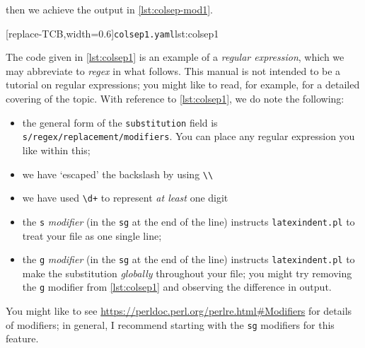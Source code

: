 \begin{example}
 then we achieve the output in \cref{lst:colsep-mod1}.  

 \begin{cmhtcbraster}
  [replace-TCB,width=0.6\textwidth]{\texttt{colsep1.yaml}}{lst:colsep1}
 \end{cmhtcbraster}

 The code given in \cref{lst:colsep1} is an example of a \emph{regular expression}, which
 we may abbreviate to \emph{regex} in what follows. This manual is not intended to be a
 tutorial on regular expressions; you might like to read, for example,
 \cite{masteringregexp} for a detailed covering of the topic. With reference to
 \cref{lst:colsep1}, we do note the following:
 \begin{itemize}
  \item the general form of the \texttt{substitution} field is
        \lstinline!s/regex/replacement/modifiers!. You can place any regular expression you like
        within this;
  \item we have `escaped' the backslash by using \lstinline!\\!
  \item we have used \lstinline!\d+! to represent \emph{at least} one digit
  \item the \texttt{s} \emph{modifier} (in the \texttt{sg} at the end of the line) instructs
        \texttt{latexindent.pl} to treat your file as one single line;
  \item the \texttt{g} \emph{modifier} (in the \texttt{sg} at the end of the line) instructs
        \texttt{latexindent.pl} to make the substitution \emph{globally} throughout your file;
        you might try removing the \texttt{g} modifier from \cref{lst:colsep1} and observing the
        difference in output.
 \end{itemize}
 You might like to see
 \href{https://perldoc.perl.org/perlre.html#Modifiers}{https://perldoc.perl.org/perlre.html\#Modifiers}
 for details of modifiers; in general, I recommend starting with the \texttt{sg} modifiers
 for this feature.
 \end{example}

